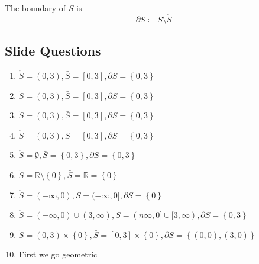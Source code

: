 \documentclass[11pt]{book}
\begin{document}
\newpage

\begin{defn}[Boundary]\label{defn:boundary}
    The boundary of $S$ is 
    \[
    \partial S \coloneqq \bar{S} \setminus \mathring{S} 
    \]
\end{defn}

\subsection{Slide Questions}%
\label{sub:slide_questions}

\begin{enumerate}
    \item $\mathring{S} = \left( 0,3 \right) , \bar{S} = \left[ 0,3 \right] , \partial S = \left\{ 0,3 \right\} $ 
    \item $\mathring{S} = \left( 0,3 \right) , \bar{S} = \left[ 0,3 \right] , \partial S = \left\{ 0,3 \right\} $ 
    \item $\mathring{S} = \left( 0,3 \right) , \bar{S} = \left[ 0,3 \right] , \partial S = \left\{ 0,3 \right\} $ 
    \item $\mathring{S} = \left( 0,3 \right) , \bar{S} = \left[ 0,3 \right] , \partial S = \left\{ 0,3 \right\} $ 
    \item $\mathring{S} = \emptyset , \bar{S} = \left\{ 0, 3 \right\} , \partial S= \left\{ 0, 3 \right\}  $ 
    \item $\mathring{S} = \mathbb{R} \setminus \left\{ 0 \right\} , \bar{S} = \mathbb{R} = \left\{ 0 \right\} $
    \item $\mathring{S} = \left(  - \infty , 0 \right), \bar{S} = (  - \infty , 0] , \partial S = \left\{ 0 \right\} $ 
    \item $\mathring{S} = \left(  - \infty ,0 \right) \cup \left( 3, \infty  \right), \bar{S} = (n\infty , 0] \cup [3, \infty ) , \partial S = \left\{ 0, 3 \right\} $ 
    \item $\mathring{S} = \left( 0, 3 \right) \times \left\{ 0 \right\}, \bar{S} = \left[ 0, 3 \right] \times \left\{ 0 \right\} , \partial S = \left\{ \left( 0, 0 \right) , \left( 3, 0 \right)  \right\}   $ 
    \item First we go geometric
        \begin{center}

\end{center}
\end{enumerate}
\end{document}
